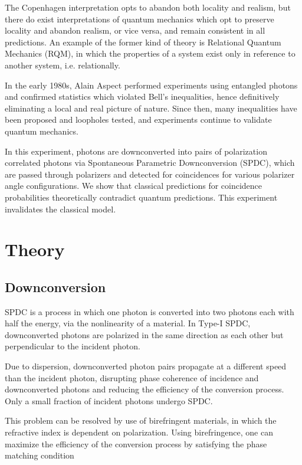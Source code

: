 \documentclass{article}
\begin{document}
The Copenhagen interpretation opts to abandon both locality and realism, but there do exist interpretations of quantum mechanics which opt to preserve locality and abandon realism, or vice versa, and remain consistent in all predictions. An example of the former kind of theory is Relational Quantum Mechanics (RQM), in which the properties of a system exist only in reference to another system, i.e. relationally.\cite{rovelli}

In the early 1980s, Alain Aspect performed experiments using entangled photons and confirmed statistics which violated Bell's inequalities, hence definitively eliminating a local and real picture of nature.\cite{aspect} Since then, many inequalities have been proposed and loopholes tested, and experiments continue to validate quantum mechanics.

In this experiment, photons are downconverted into pairs of polarization correlated photons via Spontaneous Parametric Downconversion (SPDC), which are passed through polarizers and detected for coincidences for various polarizer angle configurations. We show that classical predictions for coincidence probabilities theoretically contradict quantum predictions. This experiment invalidates the classical model.

\section{Theory}

\subsection{Downconversion}

SPDC is a process in which one photon is converted into two photons each with half the energy, via the nonlinearity of a material. In Type-I SPDC, downconverted photons are polarized in the same direction as each other but perpendicular to the incident photon.

Due to dispersion, downconverted photon pairs propagate at a different speed than the incident photon, disrupting phase coherence of incidence and downconverted photons and reducing the efficiency of the conversion process. Only a small fraction of incident photons undergo SPDC. 

This problem can be resolved by use of birefringent materials, in which the refractive index is dependent on polarization. Using birefringence, one can maximize the efficiency of the conversion process by satisfying the phase matching condition
\end{document}

